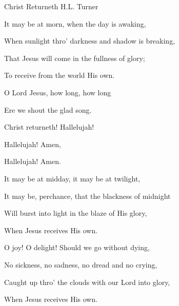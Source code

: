 \documentclass[12pt]{book}
\newcommand{\WBColBrk}{%
  \ifWordBk%
  \newpage%
\fi}
\begin{document}
\begin{song}{Christ Returneth}{}
  {\SBPubDom}
  {H.L. Turner}
  {}
  {}

  \begin{SBVerse}
    It may be at morn, when the day is awaking,

    When sunlight thro' darkness and shadow is breaking,

    That Jesus will come in the fullness of glory;

    To receive from the world His own.
  \end{SBVerse}

  \begin{SBOpGroup}
    O Lord Jesus, how long, how long

    Ere we shout the glad song.

    Christ returneth! Hallelujah!

    Hallelujah! Amen,

    Hallelujah! Amen.
  \end{SBOpGroup}

  \begin{SBVerse}
    It may be at midday, it may be at twilight,

    It may be, perchance, that the blackness of midnight

    Will burst into light in the blaze of His glory,

    When Jesus receives His own.
  \end{SBVerse}

  \begin{SBVerse}
    O joy! O delight! Should we go without dying,

    No sickness, no sadness, no dread and no crying,

    Caught up thro' the clouds with our Lord into glory,

    When Jesus receives His own.
  \end{SBVerse}
\end{song}

\end{document}
